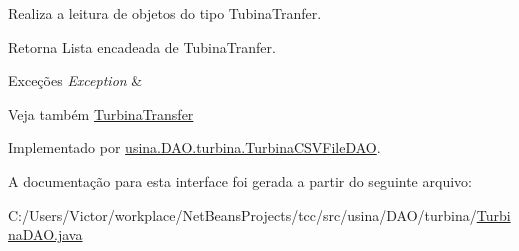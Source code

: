 Realiza a leitura de objetos do tipo Tubina\-Tranfer. 

\begin{DoxyReturn}{Retorna}
Lista encadeada de Tubina\-Tranfer. 
\end{DoxyReturn}

\begin{DoxyExceptions}{Exceções}
{\em Exception} & \\
\hline
\end{DoxyExceptions}
\begin{DoxySeeAlso}{Veja também}
\hyperlink{classusina_1_1_d_a_o_1_1turbina_1_1_turbina_transfer}{Turbina\-Transfer} 
\end{DoxySeeAlso}


Implementado por \hyperlink{classusina_1_1_d_a_o_1_1turbina_1_1_turbina_c_s_v_file_d_a_o_abf8ae21150d70fc4546232d3cefdbc2a}{usina.\-D\-A\-O.\-turbina.\-Turbina\-C\-S\-V\-File\-D\-A\-O}.



A documentação para esta interface foi gerada a partir do seguinte arquivo\-:\begin{DoxyCompactItemize}
\item 
C\-:/\-Users/\-Victor/workplace/\-Net\-Beans\-Projects/tcc/src/usina/\-D\-A\-O/turbina/\hyperlink{_turbina_d_a_o_8java}{Turbina\-D\-A\-O.\-java}\end{DoxyCompactItemize}
